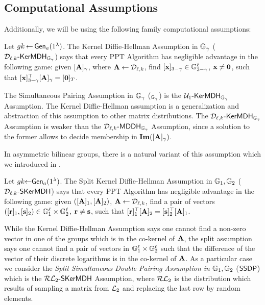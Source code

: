 \subsection{Computational Assumptions}
Additionally, we will be using the following family  computational assumptions:
\begin{definition}Let  ${gk} 
\hspace*{-1pt}
\gets
\hspace*{-1pt}
\mathsf{Gen}_a(1^\lambda)$.
The Kernel Diffie-Hellman Assumption in $\mathbb{G}_\gamma$  ($\mathcal{D}_{\ell,k}\mbox{-}\mathsf{KerMDH}_{\mathbb{G}_\gamma}$) says that every PPT Algorithm has negligible advantage in the following  game: given $[\mathbf{{A}}]_\gamma$, where $\mathbf{{A}} \gets \mathcal{D}_{\ell,k}$, find $[\mathbf{x}]_{3-\gamma} \in \mathbb{G}_{3-\gamma}^{\ell}$, $\mathbf{x} \neq \mathbf{0}$, such that 
$[\mathbf{x}]_{3-\gamma}^{\top}[\mathbf{{A}}]_{\gamma}=[\mathbf{0}]_T$. 
\end{definition}

The  Simultaneous Pairing Assumption in $\mathbb{G}_\gamma$  (\SP$_{\mathbb{G}_{\gamma}}$) is the $ \mathcal{U}_1\mbox{-}\mathsf{KerMDH}_{\mathbb{G}_{\gamma}}$ Assumption. The Kernel Diffie-Hellman assumption is a generalization and abstraction of this assumption to other matrix distributions. 
The $\mathcal{D}_{\ell,k}\mbox{-}\mathsf{KerMDH}_{\mathbb{G}_{\gamma}}$ Assumption is weaker than the $\mathcal{D}_{\ell,k}\mbox{-}\mathsf{MDDH}_{\mathbb{G}_{\gamma}}$ Assumption, since a solution to the former allows to decide membership in $\mathbf{Im}([\mathbf{{A}}]_{\gamma})$.

In asymmetric bilinear groups, there is a natural variant of this assumption which we introduced in \cite{AC:GonHevRaf15}.  
\begin{definition}
Let  ${gk} \hspace*{-3pt} \gets
\hspace*{-3pt}
\mathsf{Gen}_a(1^\lambda)$.
The Split Kernel Diffie-Hellman Assumption in $\mathbb{G}_1,\mathbb{G}_2$  ($\mathcal{D}_{\ell,k}\mbox{-}\mathsf{SKerMDH}$) says that every PPT Algorithm has negligible advantage in the following  game: given $([\mathbf{{A}}]_1,[\mathbf{{A}}]_2)$, $\mathbf{{A}} \leftarrow \mathcal{D}_{\ell,k}$, find a pair of vectors $([\mathbf{r}]_1,[\mathbf{s}]_2) \in \mathbb{G}_1^{\ell} \times \mathbb{G}_2^{\ell}$, $\mathbf{r} \neq \mathbf{s}$, such that 
$[\mathbf{r}]_1^{\top}[\mathbf{{A}}]_2=[\mathbf{s}]_2^{\top}[\mathbf{{A}}]_1$. 
\end{definition}

While the Kernel Diffie-Hellman Assumption says one cannot find a non-zero vector in one of the groups which is in the co-kernel of $\mathbf{{A}}$, the split assumption says one cannot find a pair of vectors in $\mathbb{G}_1^{\ell} \times \mathbb{G}_2^{\ell}$ such that the difference of the vector of their discrete logarithms is in the co-kernel of $\mathbf{{A}}$. 
As a particular case we consider the \emph{Split Simultaneous Double Pairing Assumption in} $\mathbb{G}_1,\mathbb{G}_2$ ($\mathsf{SSDP}$) which is the $\mathcal{RL}_{2}\mbox{-}\mathsf{SKerMDH}$ Assumption, where 
$\mathcal{RL}_{2}$ is the distribution which results of sampling a matrix from $\mathcal{L}_{2}$ and replacing the last row by random elements. 

